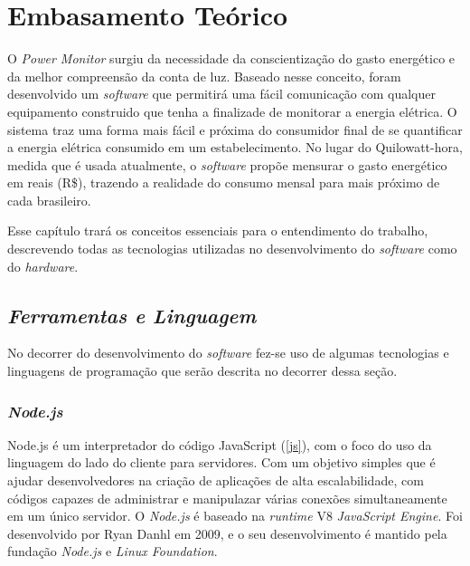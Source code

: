 \chapter[Embasamento Teórico]{Embasamento Teórico}
\label{ch:cap2}
O \textit{Power Monitor} surgiu da necessidade da conscientização do gasto energético e da melhor compreensão da conta de luz. Baseado nesse conceito,
foram desenvolvido um \textit{software} que permitirá uma fácil comunicação com qualquer equipamento construido que tenha a finalizade de monitorar a energia elétrica.
O sistema traz uma forma mais fácil e próxima do consumidor final de se quantificar a energia elétrica consumido em um estabelecimento. No lugar do Quilowatt-hora, medida que é usada atualmente,
o \textit{software} propõe mensurar o gasto energético em reais (R\$), trazendo a realidade do consumo mensal para mais próximo de cada brasileiro.

Esse capítulo trará os conceitos essenciais para o entendimento do trabalho, descrevendo todas as tecnologias utilizadas no desenvolvimento 
do \textit{software} como do \textit{hardware}.

\section[\textit{Ferramentas e Linguagem}]{\textit{Ferramentas e Linguagem}}\label{ferramenta-linguagem}
No decorrer do desenvolvimento do \textit{software} fez-se uso de algumas tecnologias e linguagens de programação que serão descrita no decorrer
dessa seção.
\subsection[\textit{Node.js}]{\textit{Node.js}}\label{node}
Node.js é um interpretador do código JavaScript (\autoref{js}), com o foco do uso da linguagem do lado do cliente para servidores. Com um objetivo simples
que é ajudar desenvolvedores na criação de aplicações de alta escalabilidade, com códigos capazes de administrar e manipulazar várias conexões simultaneamente
em um único servidor. O \textit{Node.js} é baseado na \textit{runtime} V8 \textit{JavaScript Engine}. Foi desenvolvido por Ryan Danhl em 2009, e o seu desenvolvimento
é mantido pela fundação \textit{Node.js} e \textit{Linux Foundation}. 
